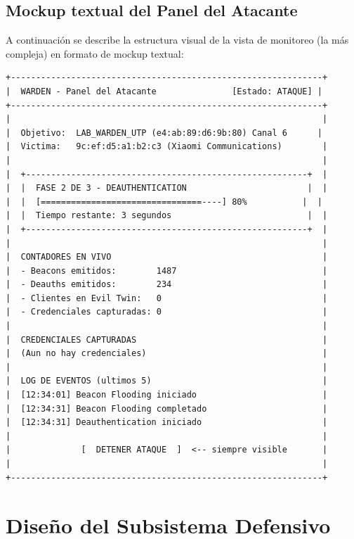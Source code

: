 \documentclass[11pt,a4paper]{article}
\begin{document}
\subsection{Mockup textual del Panel del Atacante}

A continuación se describe la estructura visual de la vista de
monitoreo (la más compleja) en formato de mockup textual:

\begin{lstlisting}
+--------------------------------------------------------------+
|  WARDEN - Panel del Atacante               [Estado: ATAQUE] |
+--------------------------------------------------------------+
|                                                              |
|  Objetivo:  LAB_WARDEN_UTP (e4:ab:89:d6:9b:80) Canal 6      |
|  Victima:   9c:ef:d5:a1:b2:c3 (Xiaomi Communications)        |
|                                                              |
|  +--------------------------------------------------------+  |
|  |  FASE 2 DE 3 - DEAUTHENTICATION                        |  |
|  |  [================================----] 80%           |  |
|  |  Tiempo restante: 3 segundos                           |  |
|  +--------------------------------------------------------+  |
|                                                              |
|  CONTADORES EN VIVO                                          |
|  - Beacons emitidos:        1487                             |
|  - Deauths emitidos:        234                              |
|  - Clientes en Evil Twin:   0                                |
|  - Credenciales capturadas: 0                                |
|                                                              |
|  CREDENCIALES CAPTURADAS                                     |
|  (Aun no hay credenciales)                                   |
|                                                              |
|  LOG DE EVENTOS (ultimos 5)                                  |
|  [12:34:01] Beacon Flooding iniciado                         |
|  [12:34:31] Beacon Flooding completado                       |
|  [12:34:31] Deauthentication iniciado                        |
|                                                              |
|              [  DETENER ATAQUE  ]  <-- siempre visible       |
|                                                              |
+--------------------------------------------------------------+
\end{lstlisting}

\section{Diseño del Subsistema Defensivo}
\end{document}
